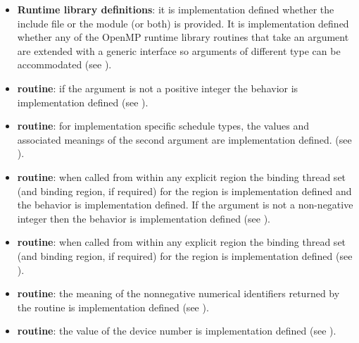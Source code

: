 \begin{itemize}
\item \textbf{Runtime library definitions}: it is implementation defined whether the include file 
 or the module  (or both) is provided. It is implementation 
defined whether any of the OpenMP runtime library routines that take an argument 
are extended with a generic interface so arguments of different  type can be 
accommodated (see ).

\fortranspecificend

\item {} \textbf{routine}: if the argument is not a positive integer the 
behavior is implementation defined (see ).

\item {} \textbf{routine}: for implementation specific schedule types, the 
values and associated meanings of the second argument are implementation defined. 
(see ).

\item {} \textbf{routine}: when called from within any explicit 
 region the binding thread set (and binding region, if required) for the 
 region is implementation defined and the 
behavior is implementation defined. If the argument is not a non-negative integer 
then the behavior is implementation defined (see ).

\item {} \textbf{routine}: when called from within any explicit 
 region the binding thread set (and binding region, if required) for the 
 region is implementation defined (see 
).

\item {} \textbf{routine}: the meaning of the 
nonnegative numerical identifiers returned by the 
 routine is implementation defined (see 
).

\item {} \textbf{routine}: the value of
  the device number is implementation defined (see ).


\end{itemize}
